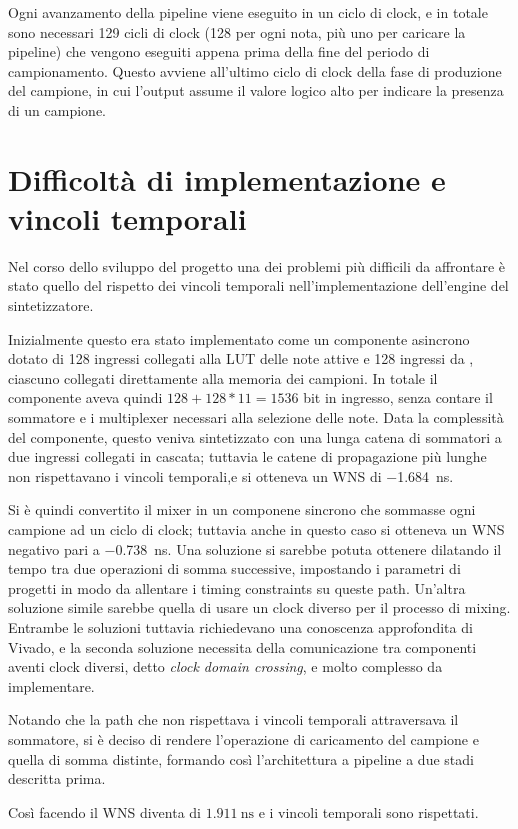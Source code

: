 Ogni avanzamento della pipeline viene eseguito in un ciclo di clock,
e in totale sono necessari 129 cicli di clock
(128 per ogni nota, più uno per caricare la pipeline) che vengono eseguiti
appena prima della fine del periodo di campionamento.
Questo avviene all'ultimo ciclo di clock della fase di produzione del
campione, in cui l'output  assume il valore
logico alto per indicare la presenza di un campione.

\section{Difficoltà di implementazione e vincoli temporali}
\label{sec:timing_impl}
Nel corso dello sviluppo del progetto una dei problemi più difficili da affrontare
è stato quello del rispetto dei vincoli temporali nell'implementazione dell'engine
del sintetizzatore.

Inizialmente questo era stato implementato come un componente asincrono dotato di 
128 ingressi collegati alla LUT delle note attive e 128 ingressi da ,
ciascuno collegati direttamente alla memoria dei campioni.
In totale il componente aveva quindi $128+128*11 = 1536$ bit in ingresso, senza contare
il sommatore e i multiplexer necessari alla selezione delle note.
Data la complessità del componente, questo veniva sintetizzato con una lunga catena
di sommatori a due ingressi collegati in cascata; tuttavia le catene di propagazione più lunghe
non rispettavano i vincoli temporali,e si otteneva un WNS di \SI{-1.684}{\nano\second}.

Si è quindi convertito il mixer in un componene sincrono che sommasse ogni campione
ad un ciclo di clock; tuttavia anche in questo caso si otteneva un WNS negativo pari
a \SI{-0.738}{\nano\second}.
Una soluzione si sarebbe potuta ottenere dilatando il tempo tra due operazioni di somma
successive, impostando i parametri di progetti in modo da allentare i timing constraints
su queste path.
Un'altra soluzione simile sarebbe quella di usare un clock diverso per il processo di mixing.
Entrambe le soluzioni tuttavia richiedevano una conoscenza approfondita di Vivado,
e la seconda soluzione necessita della comunicazione tra componenti aventi 
clock diversi, detto \textit{clock domain crossing}, e molto complesso da
implementare.

Notando che la path che non rispettava i vincoli temporali attraversava
il sommatore, si è deciso di rendere l'operazione di caricamento del campione
e quella di somma distinte, formando così l'architettura a pipeline a due stadi descritta prima.

Così facendo il WNS diventa di $\SI{1.911}{\nano \second}$ e i vincoli temporali sono rispettati.
